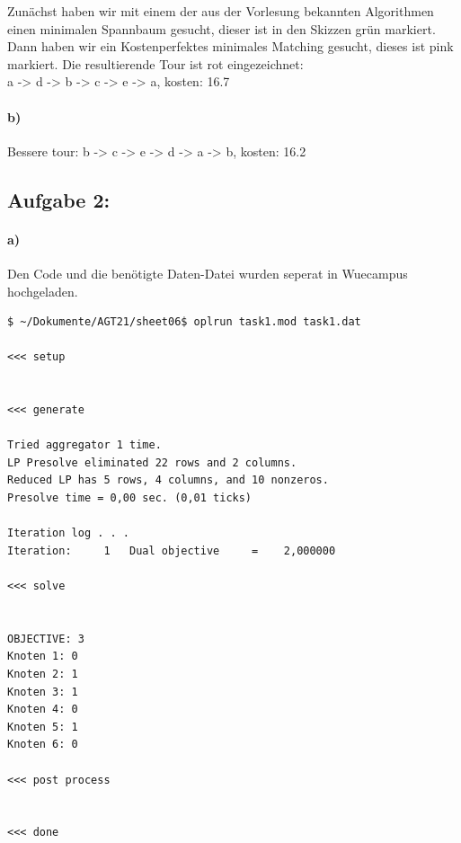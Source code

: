 \documentclass[a4paper]{article}
\begin{document}
Zunächst haben wir mit einem der aus der Vorlesung bekannten Algorithmen einen minimalen Spannbaum gesucht,
dieser ist in den Skizzen grün markiert. Dann haben wir ein Kostenperfektes minimales Matching gesucht, 
dieses ist pink markiert. Die resultierende Tour ist rot eingezeichnet: \\
a -> d -> b -> c -> e -> a, kosten: 16.7 \\
\paragraph*{b)}
Bessere tour:
b -> c -> e -> d -> a -> b, kosten: 16.2
\subsection*{Aufgabe 2:}
\paragraph{a)}
Den Code und die benötigte Daten-Datei wurden seperat in Wuecampus hochgeladen.
\begin{lstlisting}[frame=single]
$ ~/Dokumente/AGT21/sheet06$ oplrun task1.mod task1.dat 

<<< setup


<<< generate

Tried aggregator 1 time.
LP Presolve eliminated 22 rows and 2 columns.
Reduced LP has 5 rows, 4 columns, and 10 nonzeros.
Presolve time = 0,00 sec. (0,01 ticks)

Iteration log . . .
Iteration:     1   Dual objective     =    2,000000

<<< solve


OBJECTIVE: 3
Knoten 1: 0
Knoten 2: 1
Knoten 3: 1
Knoten 4: 0
Knoten 5: 1
Knoten 6: 0

<<< post process


<<< done
\end{lstlisting}
\end{document}
